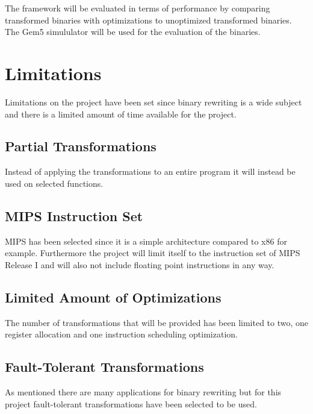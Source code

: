 The framework will be evaluated in terms of performance by
comparing transformed binaries with optimizations to
unoptimized transformed binaries. The Gem5 simululator will
be used for the evaluation of the binaries.

\section{Limitations}
Limitations on the project have been set since binary rewriting 
is a wide subject and there is a limited amount of time available
for the project.

\subsection{Partial Transformations}
Instead of applying the transformations to an entire program
it will instead be used on selected functions.

\subsection{MIPS Instruction Set}
MIPS has been selected since it is a simple architecture compared
to x86 for example. Furthermore the project will limit itself
to the instruction set of MIPS Release I and will also not
include floating point instructions in any way.  

\subsection{Limited Amount of Optimizations}
The number of transformations that will be provided has been
limited to two, one register allocation and one instruction
scheduling optimization.

\subsection{Fault-Tolerant Transformations}
As mentioned there are many applications for binary rewriting
but for this project fault-tolerant transformations have
been selected to be used. 


